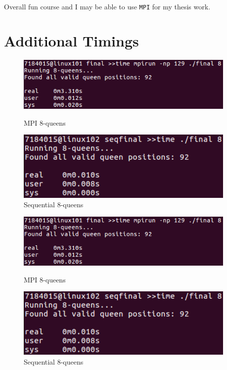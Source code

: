 \documentclass{article}
\begin{document}
Overall fun course and I may be able to use \verb|MPI| for my thesis work.

\section{Additional Timings}
\begin{figure}[h]
    \centering
    \begin{minipage}{0.49\textwidth}
        \centering
        \includegraphics[width=0.95\textwidth]{images/MPI_8}
        \caption{MPI 8-queens}
        \label{fig:mpi8}
    \end{minipage}\hfill
    \begin{minipage}{0.49\textwidth}
        \centering
        \includegraphics[width=0.95\textwidth]{images/MPI_2_8}
        \caption{Sequential 8-queens}
        \label{fig:seq8}
    \end{minipage}
\end{figure}

\begin{figure}[h]
    \centering
    \begin{minipage}{0.49\textwidth}
        \centering
        \includegraphics[width=0.95\textwidth]{images/MPI_8}
        \caption{MPI 8-queens}
        \label{fig:mpi8}
    \end{minipage}\hfill
    \begin{minipage}{0.49\textwidth}
        \centering
        \includegraphics[width=0.95\textwidth]{images/MPI_2_8}
        \caption{Sequential 8-queens}
        \label{fig:seq8}
    \end{minipage}
\end{figure}
\end{document}

